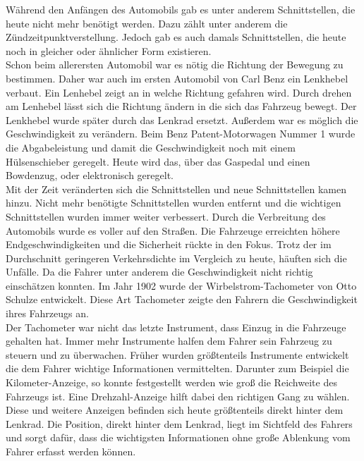 Während den Anfängen des Automobils gab es unter anderem Schnittstellen, die heute nicht mehr benötigt werden. Dazu zählt unter anderem die Zündzeitpunktverstellung. Jedoch gab es auch damals Schnittstellen, die heute noch in gleicher oder ähnlicher Form existieren.\\

Schon beim allerersten Automobil war es nötig die Richtung der Bewegung zu bestimmen. Daher war auch im ersten Automobil von Carl Benz ein Lenkhebel verbaut. Ein Lenhebel zeigt an in welche Richtung gefahren wird. Durch drehen am Lenhebel lässt sich die Richtung ändern in die sich das Fahrzeug bewegt. Der Lenkhebel wurde später durch das Lenkrad ersetzt. Außerdem war es möglich die Geschwindigkeit zu verändern. Beim Benz Patent-Motorwagen Nummer 1 wurde die Abgabeleistung und damit die Geschwindigkeit noch mit einem Hülsenschieber geregelt. Heute wird das, über das Gaspedal und einen Bowdenzug, oder elektronisch geregelt.\\%

Mit der Zeit veränderten sich die Schnittstellen und neue Schnittstellen kamen hinzu. Nicht mehr benötigte Schnittstellen wurden entfernt und die wichtigen Schnittstellen wurden immer weiter verbessert. Durch die Verbreitung des Automobils wurde es voller auf den Straßen. Die Fahrzeuge erreichten höhere Endgeschwindigkeiten und die Sicherheit rückte in den Fokus. Trotz der im Durchschnitt geringeren Verkehrsdichte im Vergleich zu heute, häuften sich die Unfälle. Da die Fahrer unter anderem die Geschwindigkeit nicht richtig einschätzen konnten. Im Jahr 1902 wurde der Wirbelstrom-Tachometer von Otto Schulze entwickelt. Diese Art Tachometer zeigte den Fahrern die Geschwindigkeit ihres Fahrzeugs an.\\ %

Der Tachometer war nicht das letzte Instrument, dass Einzug in die Fahrzeuge gehalten hat. Immer mehr Instrumente halfen dem Fahrer sein Fahrzeug zu steuern und zu überwachen. Früher wurden größtenteils Instrumente entwickelt die dem Fahrer wichtige Informationen vermittelten. Darunter zum Beispiel die Kilometer-Anzeige, so konnte festgestellt werden wie groß die Reichweite des Fahrzeugs ist. Eine Drehzahl-Anzeige hilft dabei den richtigen Gang zu wählen. Diese und weitere Anzeigen befinden sich heute größtenteils direkt hinter dem Lenkrad. Die Position, direkt hinter dem Lenkrad, liegt im Sichtfeld des Fahrers und sorgt dafür, dass die wichtigsten Informationen ohne große Ablenkung vom Fahrer erfasst werden können.\\
 
